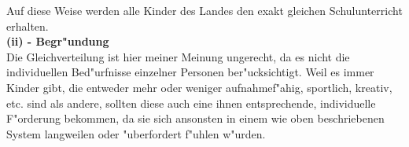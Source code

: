 \documentclass[a4paper]{article}
\begin{document}
Auf diese Weise werden alle Kinder des Landes den exakt gleichen Schulunterricht erhalten.\\

\noindent\textbf{(ii) - Begr"undung}\\
\noindent Die Gleichverteilung ist hier meiner Meinung ungerecht, da es nicht die individuellen Bed"urfnisse einzelner Personen ber"ucksichtigt. Weil es immer Kinder gibt, die entweder mehr oder weniger aufnahmef"ahig, sportlich, kreativ, etc. sind als andere, sollten diese auch eine ihnen entsprechende, individuelle F"orderung bekommen, da sie sich ansonsten in einem wie oben beschriebenen System langweilen oder "uberfordert f"uhlen w"urden.  
\end{document}

